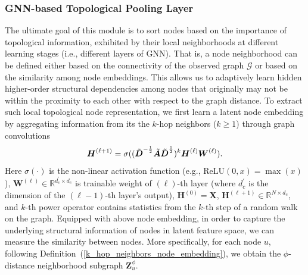 \documentclass[letterpaper]{article} %
\begin{document}
\subsubsection{GNN-based Topological Pooling Layer}
The ultimate goal of this module is to sort nodes based on the importance of topological information, exhibited by their local neighborhoods at different learning stages (i.e., different layers of GNN). That is, a node neighborhood can be defined either based on the connectivity of the observed graph $\mathcal{G}$ or based on the similarity among node embeddings. This allows us to adaptively learn hidden higher-order structural dependencies among nodes that originally may not be within the proximity to each other with respect to the graph distance. %
To extract such local topological node representation, we first learn
a latent node embedding by aggregating information from its the $k$-hop neighbors ($k \geq 1$) through graph convolutions
\begin{align}
\label{GNN_eq}
    {\boldsymbol{H}^{(\ell +1)}} = \sigma((\boldsymbol{\Tilde{D}}^{-\frac{1}{2}}\boldsymbol{\Tilde{A}}\boldsymbol{\Tilde{D}}^{\frac{1}{2}})^k\boldsymbol{H}^{(\ell)}\boldsymbol{W}^{(\ell)}).
\end{align}
Here $\sigma(\cdot)$ is the non-linear activation function (e.g., $\text{ReLU}(0, x) = \max{(x)}$), $\boldsymbol{W}^{(\ell)} \in \mathbb{R}^{d^\prime_c\times d_c}$ is trainable weight of $(\ell)$-th layer (where $d^\prime_c$ is the dimension of the $(\ell-1)$-th layer's output), $\boldsymbol{H}^{(0)} = \boldsymbol{X}$, $\boldsymbol{H}^{(\ell+1)} \in \mathbb{R}^{N \times d_c}$, and $k$-th power operator contains statistics from the $k$-th step of a random walk on the graph. %
Equipped with above node embedding, in order to capture the underlying structural information of nodes in latent feature space, we can measure the similarity between nodes. More specifically, for each node $u$, following Definition~(\ref{k_hop_neighbors_node_embedding}), we obtain the $\phi$-distance neighborhood subgraph $\boldsymbol{Z}^\phi_{u}$.
\end{document}

